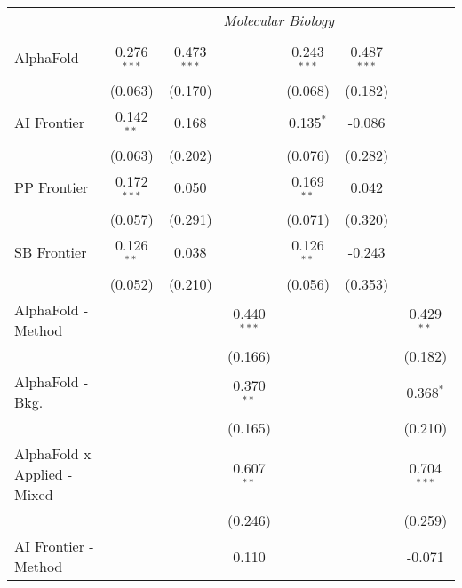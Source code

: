 \begin{tabular}{lcccccc}
 & \multicolumn{6}{c}{\textit{Molecular Biology}} \\ \\
   AlphaFold                     & 0.276$^{***}$ & 0.473$^{***}$ &                & 0.243$^{***}$ & 0.487$^{***}$ &   \\   
                                 & (0.063)       & (0.170)       &                & (0.068)       & (0.182)       &   \\   
   AI Frontier                   & 0.142$^{**}$  & 0.168         &                & 0.135$^{*}$   & -0.086        &   \\   
                                 & (0.063)       & (0.202)       &                & (0.076)       & (0.282)       &   \\   
   PP Frontier                   & 0.172$^{***}$ & 0.050         &                & 0.169$^{**}$  & 0.042         &   \\   
                                 & (0.057)       & (0.291)       &                & (0.071)       & (0.320)       &   \\   
   SB Frontier                   & 0.126$^{**}$  & 0.038         &                & 0.126$^{**}$  & -0.243        &   \\   
                                 & (0.052)       & (0.210)       &                & (0.056)       & (0.353)       &   \\   
   AlphaFold - Method            &               &               & 0.440$^{***}$  &               &               & 0.429$^{**}$\\   
                                 &               &               & (0.166)        &               &               & (0.182)\\   
   AlphaFold - Bkg.              &               &               & 0.370$^{**}$   &               &               & 0.368$^{*}$\\   
                                 &               &               & (0.165)        &               &               & (0.210)\\   
   AlphaFold x Applied - Mixed   &               &               & 0.607$^{**}$   &               &               & 0.704$^{***}$\\   
                                 &               &               & (0.246)        &               &               & (0.259)\\   
   AI Frontier - Method          &               &               & 0.110          &               &               & -0.071\\   

\end{tabular}
